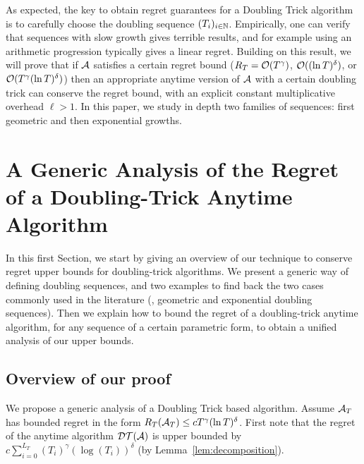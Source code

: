 \documentclass[12pt]{colt2018} %
\begin{document}
As expected, the key to obtain regret guarantees for a Doubling Trick algorithm is to carefully choose the doubling sequence $(T_i)_{i\in\mathbb{N}}$.
%
Empirically, one can verify that sequences with slow growth gives terrible results, and for example using an arithmetic progression typically gives a linear regret.
%
Building on this result, we will prove that if $\mathcal{A}$ satisfies a certain regret bound ($R_T = \mathcal{O}(T^{\gamma})$, $\mathcal{O}((\ln T)^{\delta})$, or $\mathcal{O}(T^{\gamma} (\ln T)^{\delta})$) then an appropriate anytime version of $\mathcal{A}$ with a certain doubling trick can conserve the regret bound, with an explicit constant multiplicative overhead $\ell > 1$.
%
In this paper, we study in depth two families of sequences: first geometric and then exponential growths.

\section{A Generic Analysis of the Regret of a Doubling-Trick Anytime Algorithm}

In this first Section,
we start by giving an overview of our technique to conserve regret upper bounds for doubling-trick algorithms.
We present a generic way of defining doubling sequences, and two examples to find back the two cases commonly used in the literature (\ie, geometric and exponential doubling sequences).
Then we explain how to bound the regret of a doubling-trick anytime algorithm, for any sequence of a certain parametric form, to obtain a unified analysis of our upper bounds.


\subsection{Overview of our proof}

We propose a generic analysis of a Doubling Trick based algorithm.
Assume $\mathcal{A}_T$ has bounded regret in the form $R_T(\mathcal{A}_T) \leq c T^{\gamma} (\ln T)^{\delta}$.
First note that the regret of the anytime algorithm $\mathcal{DT}(\mathcal{A})$ is upper bounded by
$c\sum_{i=0}^{L_T} (T_i)^{\gamma} (\log(T_i))^{\delta}$ (by Lemma~\ref{lem:decomposition}).
\end{document}
